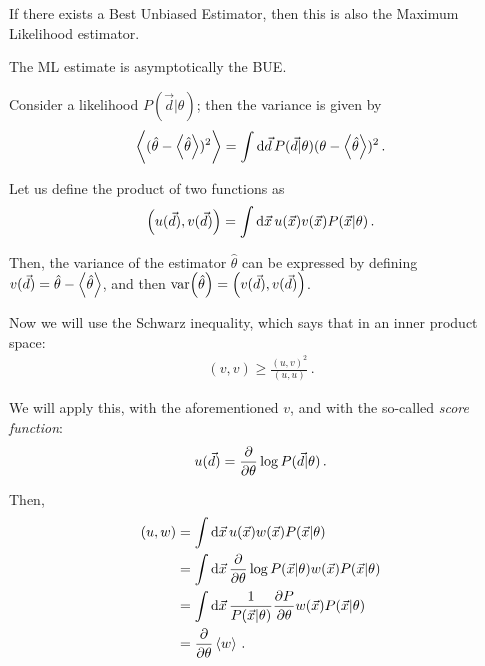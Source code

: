 \documentclass[main.tex]{subfiles}
\begin{document}
\begin{theorem}
    If there exists a Best Unbiased Estimator, then this is also the Maximum Likelihood estimator. 
\end{theorem}

\begin{theorem}
    The ML estimate is asymptotically the BUE.
\end{theorem}

Consider a likelihood \(P(\vec{d} | \theta)\); then the variance is given by 
%
\begin{align}
\expval{(\hat{\theta} - \expval{\hat{\theta}})^2} = \int \dd{\vec{d}} P(\vec{d} | \theta ) (\theta - \expval{\hat{\theta}})^2 
\,.
\end{align}

Let us define the product of two functions as 
%
\begin{align}
\qty(u (\vec{d}), v (\vec{d})) = \int \dd{\vec{x}} u (\vec{x}) v (\vec{x}) P(\vec{x} | \theta )
\,.
\end{align}

Then, the variance of the estimator \(\hat{\theta} \) can be expressed by defining \(v(\vec{d}) = \hat{\theta} - \expval{\hat{\theta}}\), and then \(\text{var} \qty(\hat{\theta}) = \qty(v(\vec{d}), v(\vec{d}))\). 

Now we will use the Schwarz inequality, which says that in an inner product space: 
%
\begin{align}
(v, v) \geq \frac{(u, v)^2}{(u, u)}
\,.
\end{align}

We will apply this, with the aforementioned \(v\), and with the so-called \emph{score function}: 
%
\begin{align}
u(\vec{d}) = \pdv{}{\theta } \log P(\vec{d} | \theta )
\,.
\end{align}
%

Then, 
%
\begin{align}
(u, w) &= \int \dd{\vec{x}} u(\vec{x}) w(\vec{x}) P(\vec{x} | \theta )  \\
&= \int \dd{\vec{x}} \pdv{}{\theta } \log P(\vec{x} | \theta ) w(\vec{x}) P(\vec{x} | \theta )  \\
&= \int \dd{\vec{x}} \frac{1}{P(\vec{x} | \theta )} \pdv{P}{\theta } w(\vec{x} ) P(\vec{x} | \theta )  \\
&= \pdv{}{\theta } \expval{w}
\,.
\end{align}
\end{document}
